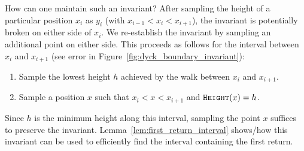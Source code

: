 How can one maintain such an invariant?
After sampling the height of a particular position $x_i$ as $y_i$ (with $x_{i-1} < x_i < x_{i+1}$),
the invariant is potentially broken on either side of $x_i$.
We re-establish the invariant by sampling an additional point on either side.
This proceeds as follows for the interval between $x_i$ and $x_{i+1}$
(see error in Figure~\ref{fig:dyck_boundary_invariant}):
\begin{enumerate}
    \item Sample the lowest height $h$ achieved by the walk between $x_i$ and $x_{i+1}$.
    \item Sample a position $x$ such that $x_i < x < x_{i+1}$ and $\texttt{\textsc{Height}}(x) = h$.
\end{enumerate}
Since $h$ is the minimum height along this interval, sampling the point $x$ suffices to preserve the invariant.
Lemma~\ref{lem:first_return_interval} shows/how this invariant can be used to efficiently find the interval containing the first return.


